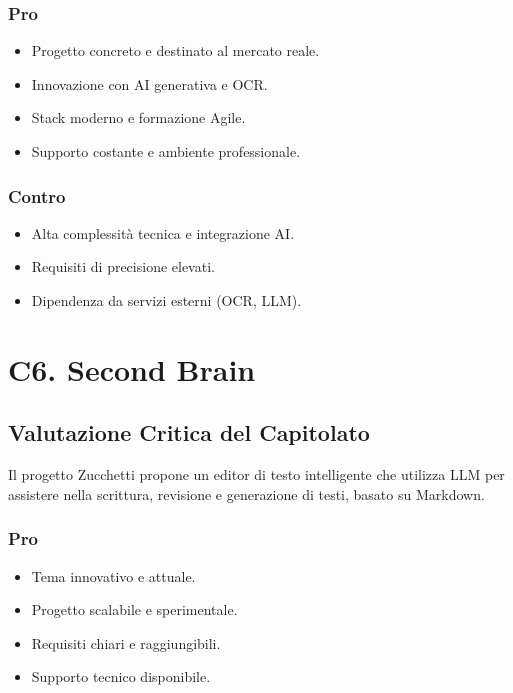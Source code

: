\documentclass[a4paper, 11pt, oneside]{scrartcl} %
\begin{document}
\subsubsection*{Pro}
\begin{itemize}
    \item Progetto concreto e destinato al mercato reale.
    \item Innovazione con AI generativa e OCR.
    \item Stack moderno e formazione Agile.
    \item Supporto costante e ambiente professionale.
\end{itemize}

\subsubsection*{Contro}
\begin{itemize}
    \item Alta complessità tecnica e integrazione AI.
    \item Requisiti di precisione elevati.
    \item Dipendenza da servizi esterni (OCR, LLM).
\end{itemize}

\section{C6. Second Brain}
\subsection*{Valutazione Critica del Capitolato}
Il progetto Zucchetti propone un editor di testo intelligente che utilizza LLM per assistere nella scrittura, revisione e generazione di testi, basato su Markdown.

\subsubsection*{Pro}
\begin{itemize}
    \item Tema innovativo e attuale.
    \item Progetto scalabile e sperimentale.
    \item Requisiti chiari e raggiungibili.
    \item Supporto tecnico disponibile.
\end{itemize}
\end{document}
